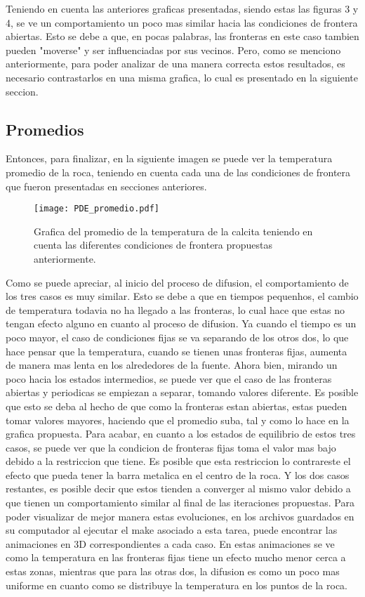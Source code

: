 \documentclass[11pt]{article}
\begin{document}
		Teniendo en cuenta las anteriores graficas presentadas, siendo estas las figuras 3 y 4, se ve un comportamiento un poco mas similar hacia las condiciones de frontera abiertas. Esto se 		debe a que, en pocas palabras, las fronteras en este caso tambien pueden "moverse" y ser influenciadas por sus vecinos. Pero, como se menciono anteriormente, para poder analizar de una 			manera correcta estos resultados, es necesario contrastarlos en una misma grafica, lo cual es presentado en la siguiente seccion. 
	
	\subsection{Promedios}

		Entonces, para finalizar, en la siguiente imagen se puede ver la temperatura promedio de la roca, teniendo en cuenta cada una de las condiciones de frontera que fueron presentadas en 			secciones anteriores. 
		\begin{figure}[H]
    			\centering
    				\texttt{[image: PDE\_promedio.pdf]}
    				\caption{Grafica del promedio de la temperatura de la calcita teniendo en cuenta las diferentes condiciones de frontera propuestas anteriormente.}
    			\label{fig:p}
		\end{figure}

		Como se puede apreciar, al inicio del proceso de difusion, el comportamiento de los tres casos es muy similar. Esto se debe a que en tiempos pequenhos, el cambio de temperatura todavia no ha llegado a las fronteras, lo cual hace que estas no tengan efecto alguno en cuanto al proceso de difusion. Ya cuando el tiempo es un poco mayor, el caso de condiciones fijas se va separando de los otros dos, lo que hace pensar que la temperatura, cuando se tienen unas fronteras fijas, aumenta de manera mas lenta en los alrededores de la fuente. Ahora bien, mirando un poco hacia los estados intermedios, se puede ver que el caso de las fronteras abiertas y periodicas se empiezan a separar, tomando valores diferente. Es posible que esto se deba al hecho de que como la fronteras estan abiertas, estas pueden tomar valores mayores, haciendo que el promedio suba, tal y como lo hace en la grafica propuesta. Para acabar, en cuanto a los estados de equilibrio de estos tres casos, se puede ver que la condicion de fronteras fijas toma el valor mas bajo debido a la restriccion que tiene. Es posible que esta restriccion lo contrareste el efecto que pueda tener la barra metalica en el centro de la roca. Y los dos casos restantes, es posible decir que estos tienden a converger al mismo valor debido a que tienen un comportamiento similar al final de las iteraciones propuestas. Para poder visualizar de mejor manera estas evoluciones, en los archivos guardados en su computador al ejecutar el make asociado a esta tarea, puede encontrar las animaciones en 3D correspondientes a cada caso. En estas animaciones se ve como la temperatura en las fronteras fijas tiene un efecto mucho menor cerca a estas zonas, mientras que para las otras dos, la difusion es como un poco mas uniforme en cuanto como se distribuye la temperatura en los puntos de la roca.
	
\end{document}
